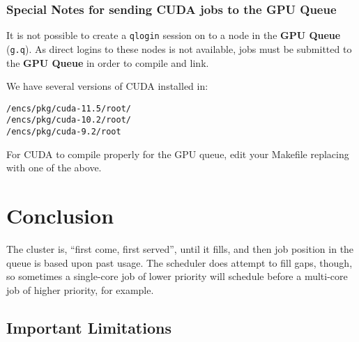 \documentclass{easychair}
\begin{document}
\subsubsection{Special Notes for sending CUDA jobs to the GPU Queue}

It is not possible to create a \texttt{qlogin} session on to a node in the 
\textbf{GPU Queue} (\texttt{g.q}). As direct logins to these nodes is not 
available, jobs must be submitted to the \textbf{GPU Queue} in order to compile 
and link.

We have several versions of CUDA installed in:
\begin{verbatim}
/encs/pkg/cuda-11.5/root/
/encs/pkg/cuda-10.2/root/
/encs/pkg/cuda-9.2/root
\end{verbatim}

For CUDA to compile properly for the GPU queue, edit your Makefile 
replacing  with one of the above.

\section{Conclusion}
\label{sect:conclusion}

The cluster is, ``first come, first served'', until it fills, and then job
position in the queue is based upon past usage. The scheduler does attempt
to fill gaps, though, so sometimes a single-core job of lower priority
will schedule before a multi-core job of higher priority, for example.

\subsection{Important Limitations}
\label{sect:limitations}
\end{document}
